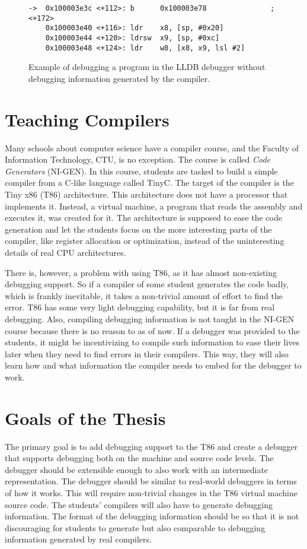 \begin{figure}
\begin{lstlisting}
->  0x100003e3c <+112>: b      0x100003e78               ; <+172>
    0x100003e40 <+116>: ldr    x8, [sp, #0x20]
    0x100003e44 <+120>: ldrsw  x9, [sp, #0xc]
    0x100003e48 <+124>: ldr    w8, [x8, x9, lsl #2]
\end{lstlisting}
\caption{Example of debugging a program in the LLDB debugger without debugging
    information generated by the compiler.}
\label{fig:lldb-debug2}
\end{figure}

\section{Teaching Compilers}
Many schools about computer science have a compiler course, and the Faculty of
Information Technology, CTU, is no exception. The course is called \textit{Code
Generators} (NI-GEN). In this course, students are tasked to build a simple
compiler from a C-like language called TinyC. The target of the compiler is the
Tiny x86 (T86) architecture. This architecture does not have a processor that
implements it. Instead, a virtual machine, a program that reads the assembly
and executes it, was created for it. The architecture is supposed to ease the
code generation and let the students focus on the more interesting parts of the
compiler, like register allocation or optimization, instead of the
uninteresting details of real CPU architectures.

There is, however, a problem with using T86, as it has almost non-existing
debugging support. So if a compiler of some student generates the code badly,
which is frankly inevitable, it takes a non-trivial amount of effort to find
the error. T86 has some very light debugging capability, but it is far from
real debugging. Also, compiling debugging information is not taught in the
NI-GEN course because there is no reason to as of now. If a debugger was
provided to the students, it might be incentivizing to compile such information
to ease their lives later when they need to find errors in their compilers.
This way, they will also learn how and what information the compiler needs to
embed for the debugger to work.

\section{Goals of the Thesis}
The primary goal is to add debugging support to the T86 and create a debugger
that supports debugging both on the machine and source code levels. The
debugger should be extensible enough to also work with an intermediate
representation. The debugger should be similar to real-world debuggers in terms
of how it works. This will require non-trivial changes in the T86 virtual
machine source code. The students' compilers will also have to generate
debugging information. The format of the debugging information should be so
that it is not discouraging for students to generate but also comparable to
debugging information generated by real compilers.

